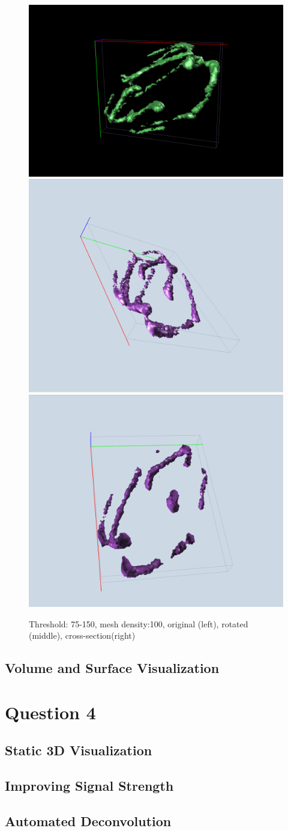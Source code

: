\documentclass{article}
\begin{document}
\begin{figure}
    \centering
    \includegraphics[width=0.3\linewidth]{Report/Images/6.3.2/150-255,100.png}
    \includegraphics[width=0.3\linewidth]{Report/Images/6.3.2/150-255,100-rotated.png}
    \includegraphics[width=0.3\linewidth]{Report/Images/6.3.2/150-255,100-sliced.png}
    \caption{Threshold: 75-150, mesh density:100, original (left), rotated (middle), cross-section(right)}
    \label{fig:enter-label}
\end{figure}








\subsection*{Volume and Surface Visualization}

\section*{Question 4}
\subsection*{Static 3D Visualization}
\subsection*{Improving Signal Strength}
\subsection*{Automated Deconvolution}
\end{document}
